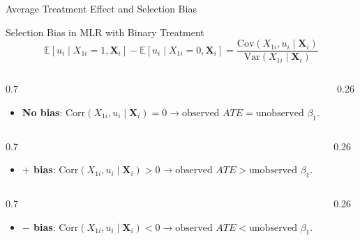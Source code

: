 \documentclass[9pt,aspectratio=169]{beamer}
\newcommand{\E}{\mathbb{E}}
\newcommand{\Var}{\mathrm{Var}}
\newcommand{\Cov}{\mathrm{Cov}}
\begin{document}
\begin{frame}{Average Treatment Effect and Selection Bias}
  \begin{block}{Selection Bias in MLR with Binary Treatment}
    \[
    \E[u_i\mid X_{1i}=1, \boldsymbol{X}_i]-\E[u_i\mid X_{1i}=0, \boldsymbol{X}_i]
    =
    \frac{\Cov(X_{1i},u_i\mid\boldsymbol{X}_i)}{\Var(X_{1i}\mid\boldsymbol{X}_i)}
    \]
  \end{block}
  \begin{columns}[c]
  \begin{column}{0.7\textwidth}
  \begin{itemize}
    \item<1-> \textbf{No bias}: $\mathrm{Corr}(X_{1i},u_i\mid\boldsymbol{X}_i)=0 \rightarrow \text{observed } ATE= \text{unobserved } \beta_1$.
  \end{itemize}
  \end{column}
  \begin{column}{0.26\textwidth}
  \centering
  \end{column}
  \end{columns}
  \begin{columns}[c]
  \begin{column}{0.7\textwidth}
  \begin{itemize}
    \item<2-> \textbf{$+$ bias}: $\mathrm{Corr}(X_{1i},u_i\mid\boldsymbol{X}_i)>0 \rightarrow \text{observed } ATE> \text{unobserved } \beta_1$.
  \end{itemize}
  \end{column}
  \begin{column}{0.26\textwidth}
  \centering
  \end{column}
  \end{columns}
  \begin{columns}[c]
  \begin{column}{0.7\textwidth}
  \begin{itemize}
    \item<3-> \textbf{$-$ bias}: $\mathrm{Corr}(X_{1i},u_i\mid\boldsymbol{X}_i)<0 \rightarrow \text{observed } ATE< \text{unobserved } \beta_1$.
  \end{itemize}
  \end{column}
  \begin{column}{0.26\textwidth}
  \centering
  \end{column}
  \end{columns}
\end{frame}
\end{document}
